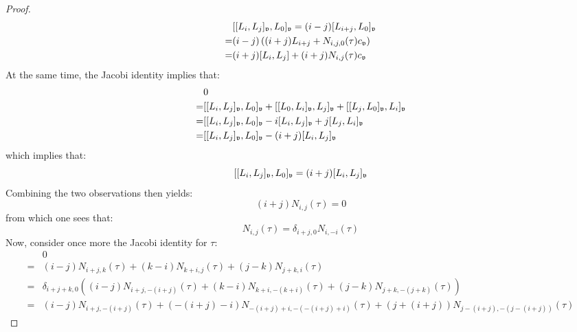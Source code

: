 \begin{proof}
$$\begin{aligned}
                            & [[L_i, L_j]_{\frakv}, L_0]_{\frakv} = (i - j) [L_{i + j}, L_0]_{\frakv}
                            \\
                            = & (i - j) \left( (i + j) L_{i + j} + N_{i, j, 0}(\tau) c_{\frakv} \right)
                            \\
                            = & (i + j) [L_i, L_j] + (i + j) N_{i, j}(\tau) c_{\frakv}
                        \end{aligned}
                    $$
                At the same time, the Jacobi identity implies that:
                    $$
                        \begin{aligned}
                            & 0
                            \\
                            = & [[L_i, L_j]_{\frakv}, L_0]_{\frakv} + [[L_0, L_i]_{\frakv}, L_j]_{\frakv} + [[L_j, L_0]_{\frakv}, L_i]_{\frakv}
                            \\
                            = & [[L_i, L_j]_{\frakv}, L_0]_{\frakv} - i [L_i, L_j]_{\frakv} + j [L_j, L_i]_{\frakv}
                            \\
                            = & [[L_i, L_j]_{\frakv}, L_0]_{\frakv} - (i + j) [L_i, L_j]_{\frakv}
                        \end{aligned}
                    $$
                which implies that:
                    $$[[L_i, L_j]_{\frakv}, L_0]_{\frakv} = (i + j) [L_i, L_j]_{\frakv}$$
                Combining the two observations then yields:
                    $$(i + j) N_{i, j}(\tau) = 0$$
                from which one sees that:
                    $$N_{i, j}(\tau) = \delta_{i + j, 0} N_{i, -i}(\tau)$$
                Now, consider once more the Jacobi identity for $\tau$:
                    $$
                        \begin{aligned}
                            & 0
                            \\
                            = & (i - j) N_{i + j, k}(\tau) + (k - i) N_{k + i, j}(\tau) + (j - k) N_{j + k, i}(\tau)
                            \\
                            = & \delta_{i + j + k, 0} \left( (i - j)  N_{i + j, -(i + j)}(\tau) + (k - i) N_{k + i, -(k + i)}(\tau) + (j - k) N_{j + k, -(j + k)}(\tau) \right)
                            \\
                            = & (i - j)  N_{i + j, -(i + j)}(\tau) + (-(i + j) - i) N_{-(i + j) + i, -(-(i + j) + i)}(\tau) + (j + (i + j)) N_{j - (i + j), -(j -(i + j))}(\tau)

\end{aligned}$$
\end{proof}

